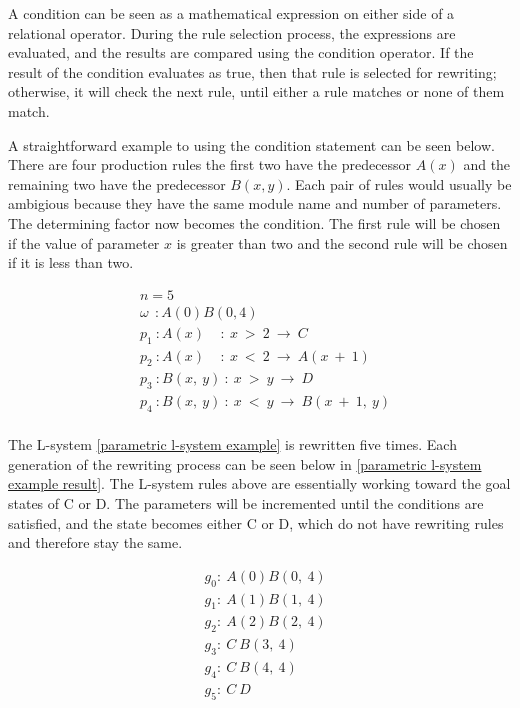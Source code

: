 A condition can be seen as a mathematical expression on either side of a relational operator. During the rule selection process, the expressions are evaluated, and the results are compared using the condition operator. If the result of the condition evaluates as true, then that rule is selected for rewriting; otherwise, it will check the next rule, until either a rule matches or none of them match. 

A straightforward example to using the condition statement can be seen below. There are four production rules the first two have the predecessor $A(x)$ and the remaining two have the predecessor $B(x, y)$. Each pair of rules would usually be ambigious because they have the same module name and number of parameters. The determining factor now becomes the condition. The first rule will be chosen if the value of parameter $x$ is greater than two and the second rule will be chosen if it is less than two.

\begin{singlespace}
\begin{equation} \label{parametric l-system example}
\begin{aligned}
	&n=5 \\
	&\omega~~ : A(0)B(0,4)\\
	&p_1~ :  A(x)~~~~~ :~ x~ >~ 2~ \rightarrow~ C\\
	&p_2~ :  A(x)~~~~~ :~ x~ <~ 2~ \rightarrow~ A(x~ +~ 1)\\
	&p_3~ :  B(x,~ y)~ :~ x~ >~ y~ \rightarrow~ D\\
	&p_4~ :  B(x,~ y)~ :~ x~ <~ y~ \rightarrow~ B(x~ +~ 1,~ y)\\
\end{aligned}
\end{equation}
\end{singlespace}

\vspace{5mm}
\noindent
The L-system \ref{parametric l-system example} is rewritten five times. Each generation of the rewriting process can be seen below in \ref{parametric l-system example result}. The L-system rules above are essentially working toward the goal states of C or D. The parameters will be incremented until the conditions are satisfied, and the state becomes either C or D, which do not have rewriting rules and therefore stay the same.

\begin{singlespace}
\begin{equation} \label{parametric l-system example result}
\begin{aligned}
	&g_0 :~ A(0)B(0,~4)\\
	&g_1 :~ A(1)B(1,~4)\\
	&g_2 :~ A(2)B(2,~4)\\
	&g_3 :~ C~B(3,~4)\\
	&g_4 :~ C~B(4,~4)\\
	&g_5 :~ C~D\\
\end{aligned}
\end{equation}
\end{singlespace}

